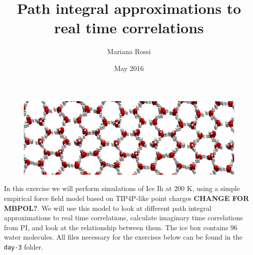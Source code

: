 \documentclass{article}
\title{Path integral approximations to real time correlations}
\author{Mariana Rossi}
\date{May 2016}
\begin{document}
\maketitle

\begin{figure}[ht]
\centering
\includegraphics[width=\textwidth]{ice.png}
\end{figure}

In this exercise we will perform
simulations of Ice Ih at 200 K,
using a simple empirical force field model based
on TIP4P-like point charges {\bf CHANGE FOR MBPOL?}. We will use this model to look
at different path integral approximations to real time correlations, calculate imaginary
time correlations from PI, and look at the relationship between them. The ice box contains 96 water molecules.
All files necessary for the exercises below can be found in the \texttt{day-3} folder.




\end{document}
